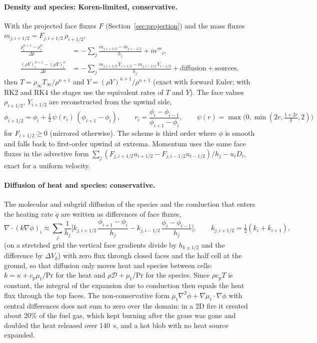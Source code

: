 \documentclass[11pt,a4paper]{article}
\begin{document}
\paragraph{Density and species: Koren-limited, conservative.}
With the projected face fluxes $F$ (Section~\ref{sec:projection}) and the mass fluxes
$m_{j,i+1/2}=F_{j,i+1/2}\,\rho_{i+1/2}$,
\begin{align}
  \frac{\rho_i^{n+1}-\rho_i^n}{\Delta t} &= -\sum_j\frac{m_{j,i+1/2}-m_{j,i-1/2}}{h_j} + \dot m'''_i,\\[4pt]
  \frac{(\rho Y)_i^{n+1}-(\rho Y)_i^n}{\Delta t} &= -\sum_j\frac{m_{j,i+1/2}\,Y_{i+1/2}-m_{j,i-1/2}\,Y_{i-1/2}}{h_j}
    + \text{diffusion} + \text{sources},
\end{align}
then $T=\rho_\infty T_\infty/\rho^{n+1}$ and $Y=(\rho Y)^{n+1}/\rho^{n+1}$ (exact with forward Euler; with RK2
and RK4 the stages use the equivalent rates of $T$ and $Y$). The face values $\rho_{i+1/2}$, $Y_{i+1/2}$ are
reconstructed from the upwind side,
\begin{equation}
  \phi_{i+1/2} = \phi_i + \tfrac12\,\psi(r_i)\,(\phi_{i+1}-\phi_i),\qquad
  r_i=\frac{\phi_i-\phi_{i-1}}{\phi_{i+1}-\phi_i},\qquad
  \psi(r)=\max\!\big(0,\min(2r,\tfrac{1+2r}{3},2)\big)
\end{equation}
for $F_{i+1/2}\ge0$ (mirrored otherwise). The scheme is third order where $\phi$ is smooth and falls
back to first-order upwind at extrema. Momentum uses the same face fluxes in the advective form
$\sum_j(F_{j,i+1/2}u_{i+1/2}-F_{j,i-1/2}u_{i-1/2})/h_j-u_iD_i$, exact for a uniform velocity.

\paragraph{Diffusion of heat and species: conservative.}
The molecular and subgrid diffusion of the species and the conduction that enters the heating rate
$\dot q$ are written as differences of face fluxes,
\begin{equation}
  \nabla\cdot(k\nabla\phi)_i\approx\sum_j\frac{1}{h_j}\Big[k_{j,i+1/2}\,\frac{\phi_{i+1}-\phi_i}{h_j}-k_{j,i-1/2}\,\frac{\phi_i-\phi_{i-1}}{h_j}\Big],
  \qquad k_{j,i+1/2}=\tfrac12(k_i+k_{i+1}),
\end{equation}
(on a stretched grid the vertical face gradients divide by $h_{k\pm1/2}$ and the difference by $\Delta V_k$)
with zero flux through closed faces and the half cell at the ground, so that diffusion only moves heat
and species between cells: $k=\kappa+c_\text{p}\mu_\text{t}/\mathrm{Pr}$ for the heat and $\rho\mathcal D+\mu_\text{t}/\mathrm{Pr}$ for the
species. Since $\rho c_\text{p}T$ is constant, the integral of the expansion due to conduction then equals the
heat flux through the top faces. The non-conservative form
$\mu_\text{t}\nabla^2\phi+\nabla\mu_\text{t}\cdot\nabla\phi$ with central differences does not sum to zero over the
domain: in a 2D fire it created about 20\% of the fuel gas, which kept burning after the grass was gone
and doubled the heat released over 140~s, and a hot blob with no heat source expanded.
\end{document}
